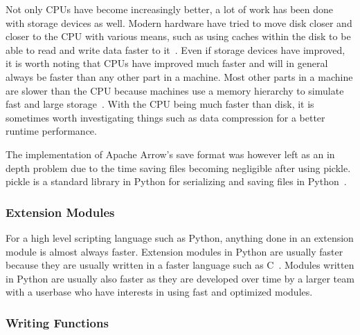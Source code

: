 \documentclass[12pt, a4paper]{article}
\begin{document}
Not only CPUs have become increasingly better, a lot of work has been done with storage devices as well.
Modern hardware have tried to move disk closer and closer to the CPU with various means, such as using caches within the disk to be able to read and write data faster to it~\cite{enwiki:1015447262}.
Even if storage devices have improved, it is worth noting that CPUs have improved much faster and will in general always be faster than any other part in a machine.
Most other parts in a machine are slower than the CPU because machines use a memory hierarchy to simulate fast and large storage~\cite{ComputerMemoryHierarchy, enwiki:memoryHierarchy}.
With the CPU being much faster than disk, it is sometimes worth investigating things such as data compression for a better runtime performance.

The implementation of Apache Arrow's save format was however left as an in depth problem due to the time saving files becoming negligible after using pickle.
pickle is a standard library in Python for serializing and saving files in Python~\cite{Py:pickle}.

\subsubsection{Extension Modules}
For a high level scripting language such as Python, anything done in an extension module is almost always faster.
Extension modules in Python are usually faster because they are usually written in a faster language such as C~\cite{cFaster}.
Modules written in Python are usually also faster as they are developed over time by a larger team with a userbase who have interests in using fast and optimized modules.

\subsubsection{Writing Functions}
\end{document}
